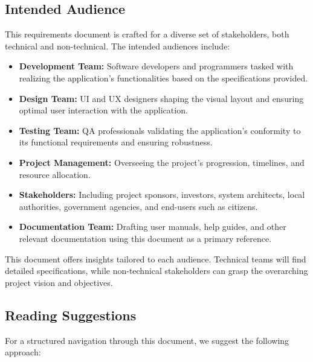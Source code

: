 \subsection{Intended Audience}
This requirements document is crafted for a diverse set of stakeholders, both technical and non-technical. The intended audiences include:

    \begin{itemize}
        \item \textbf{Development Team:} Software developers and programmers tasked with realizing the application's functionalities based on the specifications provided.
        
        \item \textbf{Design Team:} \gls{UI} and \gls{UX} designers shaping the visual layout and ensuring optimal user interaction with the application.
        
        \item \textbf{Testing Team:} \gls{QA} professionals validating the application's conformity to its functional requirements and ensuring robustness.
        
        \item \textbf{Project Management:} Overseeing the project's progression, timelines, and resource allocation.
        
        \item \textbf{Stakeholders:} Including project sponsors, investors, system architects, local authorities, government agencies, and \gls{end-user}s such as citizens.
        
        \item \textbf{Documentation Team:} Drafting user manuals, help guides, and other relevant documentation using this document as a primary reference.
    \end{itemize}

This document offers insights tailored to each audience. Technical teams will find detailed specifications, while non-technical stakeholders can grasp the overarching project vision and objectives.

\subsection{Reading Suggestions}
For a structured navigation through this document, we suggest the following approach:

